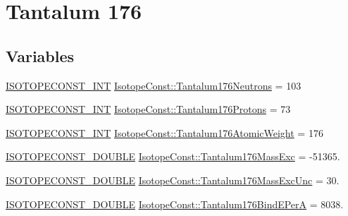\hypertarget{group___isotope_const-_tantalum-_ta176}{}\section{Tantalum 176}
\label{group___isotope_const-_tantalum-_ta176}
\subsection*{Variables}
\begin{DoxyCompactItemize}
\item 
\mbox{\hyperlink{group___isotope_const-_macros_ga5f18360b3e99483a35c32d789e62621c}{I\+S\+O\+T\+O\+P\+E\+C\+O\+N\+S\+T\+\_\+\+I\+NT}} \mbox{\hyperlink{group___isotope_const-_tantalum-_ta176_gafd1ee9b95c2f2d59f0043d84afc6422b}{Isotope\+Const\+::\+Tantalum176\+Neutrons}} = 103
\item 
\mbox{\hyperlink{group___isotope_const-_macros_ga5f18360b3e99483a35c32d789e62621c}{I\+S\+O\+T\+O\+P\+E\+C\+O\+N\+S\+T\+\_\+\+I\+NT}} \mbox{\hyperlink{group___isotope_const-_tantalum-_ta176_ga5b972d733934691b9f23e85e4ba862eb}{Isotope\+Const\+::\+Tantalum176\+Protons}} = 73
\item 
\mbox{\hyperlink{group___isotope_const-_macros_ga5f18360b3e99483a35c32d789e62621c}{I\+S\+O\+T\+O\+P\+E\+C\+O\+N\+S\+T\+\_\+\+I\+NT}} \mbox{\hyperlink{group___isotope_const-_tantalum-_ta176_gaa1193fb8508c77629e50bab7400592b4}{Isotope\+Const\+::\+Tantalum176\+Atomic\+Weight}} = 176
\item 
\mbox{\hyperlink{group___isotope_const-_macros_ga8f45a7272ce02c0b4c65c44636ed719a}{I\+S\+O\+T\+O\+P\+E\+C\+O\+N\+S\+T\+\_\+\+D\+O\+U\+B\+LE}} \mbox{\hyperlink{group___isotope_const-_tantalum-_ta176_gaabad5b22ab61c04424b799ca45cebc8c}{Isotope\+Const\+::\+Tantalum176\+Mass\+Exc}} = -\/51365.
\item 
\mbox{\hyperlink{group___isotope_const-_macros_ga8f45a7272ce02c0b4c65c44636ed719a}{I\+S\+O\+T\+O\+P\+E\+C\+O\+N\+S\+T\+\_\+\+D\+O\+U\+B\+LE}} \mbox{\hyperlink{group___isotope_const-_tantalum-_ta176_gae60d79f8a3f743c503e89f0547d72cf9}{Isotope\+Const\+::\+Tantalum176\+Mass\+Exc\+Unc}} = 30.
\item 
\mbox{\hyperlink{group___isotope_const-_macros_ga8f45a7272ce02c0b4c65c44636ed719a}{I\+S\+O\+T\+O\+P\+E\+C\+O\+N\+S\+T\+\_\+\+D\+O\+U\+B\+LE}} \mbox{\hyperlink{group___isotope_const-_tantalum-_ta176_gaaefef8c8aef0631d3b30012daf4dcbb1}{Isotope\+Const\+::\+Tantalum176\+Bind\+E\+PerA}} = 8038.
\item 

\end{DoxyCompactItemize}
